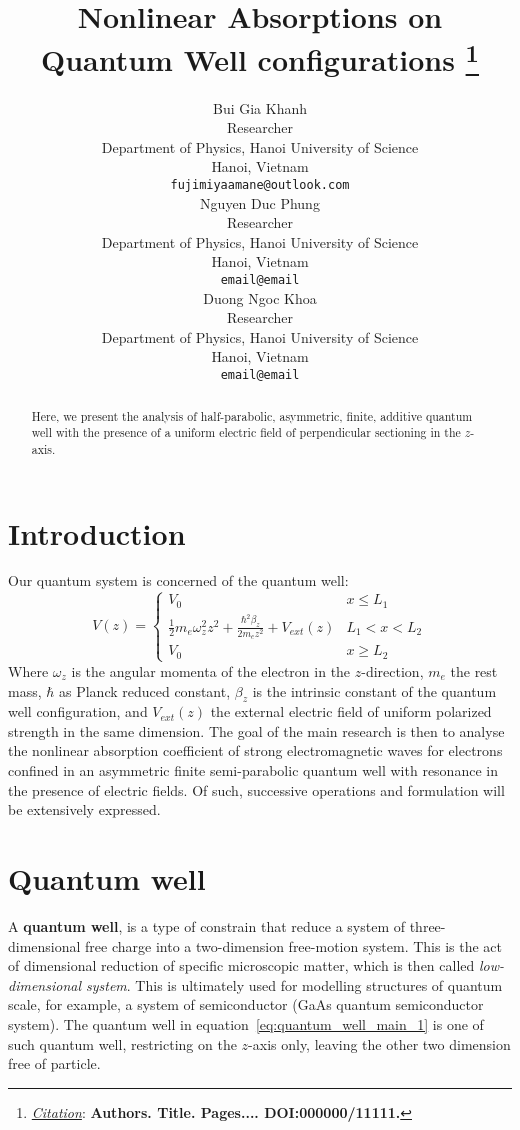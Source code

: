 \documentclass{article}
\title{Nonlinear Absorptions on Quantum Well configurations
\thanks{\textit{\underline{Citation}}: 
\textbf{Authors. Title. Pages.... DOI:000000/11111.}} 
}
\author{
  Bui Gia Khanh\\
   Researcher \\
  Department of Physics, Hanoi University of Science \\
  Hanoi, Vietnam\\
  \texttt{fujimiyaamane@outlook.com} \\
   \AND
  Nguyen Duc Phung \\
   Researcher \\
   Department of Physics, Hanoi University of Science \\
  Hanoi, Vietnam\\
  \texttt{email@email} \\
  \And 
  Duong Ngoc Khoa \\
   Researcher \\
   Department of Physics, Hanoi University of Science \\
  Hanoi, Vietnam \\
  \texttt{email@email} 
}
\begin{document}
\maketitle

\begin{abstract}
    Here, we present the analysis of half-parabolic, asymmetric, finite, additive quantum well with the presence of a uniform electric field of perpendicular sectioning in the $z$-axis.   
\end{abstract}

\section{Introduction}
Our quantum system is concerned of the quantum well: 
\begin{equation}\label{eq:quantum_well_main_1}
    V(z)=\begin{cases}
        V_{0} & x \leq L_{1} \\
        \frac{1}{2}m_{{e}}\omega_{z}^{2}z^{2}+ \frac{\hbar^{2}\beta_{z}}{2m_{e}z^{2}} + V_{ext}(z) & L_{1} < x < L_{2}\\
        V_{0} & x \geq L_{2}
    \end{cases}
\end{equation}
Where $\omega_{z}$ is the angular momenta of the electron in the $z$-direction, $m_{e}$ the rest mass, $\hbar$ as Planck reduced constant, $\beta_{z}$ is the intrinsic constant of the quantum well configuration, and $V_{ext}(z)$ the external electric field of uniform polarized strength in the same dimension. The goal of the main research is then to analyse the nonlinear absorption coefficient of strong electromagnetic waves for electrons confined in an asymmetric finite semi-parabolic quantum well with resonance in the presence of electric fields. Of such, successive operations and formulation will be extensively expressed. 
\section{Quantum well}
A \textbf{quantum well}, is a type of constrain that reduce a system of three-dimensional free charge into a two-dimension free-motion system. This is the act of dimensional reduction of specific microscopic matter, which is then called \textit{low-dimensional system}. This is ultimately used for modelling structures of quantum scale, for example, a system of semiconductor (\textsf{GaAs} quantum semiconductor system). The quantum well in equation~\ref{eq:quantum_well_main_1} is one of such quantum well, restricting on the $z$-axis only, leaving the other two dimension free of particle. 
\end{document}
